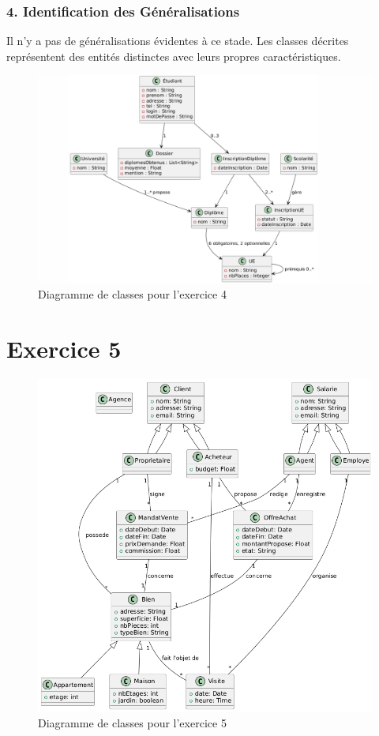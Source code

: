 \documentclass{article}
\begin{document}
\subsubsection*{4. Identification des Généralisations}

Il n’y a pas de généralisations évidentes à ce stade. Les classes décrites représentent des entités distinctes avec leurs propres caractéristiques.

\begin{figure}[h]
  \centering
  \includegraphics[width=\textwidth]{exo4.png}
  \caption{Diagramme de classes pour l'exercice 4}
\end{figure}

\section*{Exercice 5}

\begin{figure}[h]
  \centering
  \includegraphics[width=\textwidth]{exo5.png}
  \caption{Diagramme de classes pour l'exercice 5}
\end{figure}
\end{document}
